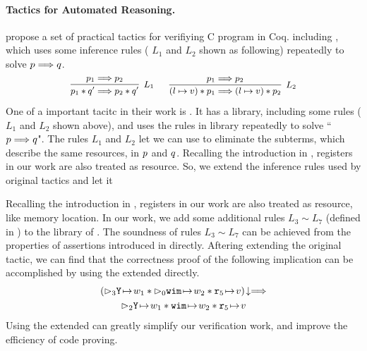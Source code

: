 \paragraph{\textbf{Tactics for Automated Reasoning.}} 
\cite{practical-tactics} propose a set of practical tactics 
for verifiying C program in Coq. 
including \sepcancel{}, which uses some 
inference rules (\eg{} $L_1$ and $L_2$ shown as following) 
repeatedly to solve $p \Longrightarrow q$. 
\[
    \small
    \infer[L_1]
    {
        \astP_1 \sepstar \astQ' \Longrightarrow \astP_2 \sepstar \astQ'
    }
    {
        \astP_1 \Longrightarrow \astP_2
    } \quad \ \  
    \infer[L_2]
    {
        (\sepsto{\loc}{\val}) \sepstar \astP_1 \Longrightarrow 
        (\sepsto{\loc}{\val}) \sepstar \astP_2
    }
    {
        \astP_1 \Longrightarrow \astP_2
    }
\]
One of a important tacitc in their work is \sepcancel{}. 
It has a library, including some rules (\eg{} $L_1$ and $L_2$ shown above), 
and uses the rules in library repeatedly to solve 
``$p \Longrightarrow q$". The rules $L_1$ and $L_2$  
let we can use \sepcancel{} to eliminate the 
subterms, which describe the same resources, 
in $p$ and $q$.
Recalling the introduction in \Sec{\ref{subsec:assertions}}, 
registers in our work are also treated as resource. 
So, we extend the inference rules used by original \sepcancel{} tactics
and let it  

Recalling the introduction in \Sec{\ref{subsec:assertions}}, 
registers in our work are also treated as resource, like memory location. 
In our work, we add some additional rules $L_3 \sim L_7$ 
(defined in \Fig{\ref{fig:ext-rule-tac-sepcancel}})
to the library of \sepcancel{}. The soundness of rules $L_3 \sim L_7$ 
can be achieved from the properties of assertions introduced in 
\Sec{\ref{subsec:assertions}} directly. Aftering extending the original 
\sepcancel{} tactic, we can find that the correctness proof
of the following implication can be accomplished by using 
the extended \sepcancel{} directly.
\begin{multline*}
    \nxtAst{(\dlyregst{3}{\regY}{\word_1} \sepstar 
    \dlyregst{0}{\regwim}{\word_2} \sepstar 
    \regst{\reg{5}}{\val})} \Longrightarrow \\
    \dlyregst{2}{\regY}{\word_1} \sepstar 
    \regst{\regwim}{\word_2} \sepstar 
    \regst{\reg{5}}{\val}
\end{multline*}
Using the extended \sepcancel{} can greatly simplify our verification 
work, and improve the efficiency of code proving. 

